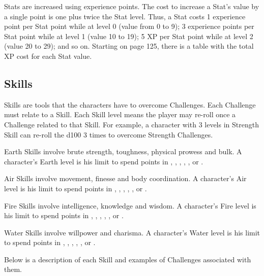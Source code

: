 \begin{multicols}{2}
Stats are increased using experience points. The cost to increase a Stat's value by a single point is one plus twice the Stat level. Thus, a Stat costs 1 experience point per Stat point while at level 0 (value from 0 to 9); 3 experience points per Stat point while at level 1 (value 10 to 19); 5 XP per Stat point while at level 2 (value 20 to 29); and so on. Starting on page 125, there is a table with the total XP cost for each Stat value. \pc
{\centering %
}%

\subsection{Skills}
\label{subsec:skills}
\begin{ffcolpage}
Skills are tools that the characters have to overcome Challenges. Each Challenge must relate to a Skill. Each Skill level means the player may re-roll once a Challenge related to that Skill. For example, a character with 3 levels in Strength Skill can re-roll the d100 3 times to overcome Strength Challenges. \pc

Earth Skills involve brute strength, toughness, physical prowess and bulk. A character's Earth level is his limit to spend points in , , , , , or . \pc

Air Skills involve movement, finesse and body coordination. A character's Air level is his limit to spend points in , , , , , or . \pc

Fire Skills involve intelligence, knowledge and wisdom. A character's Fire level is his limit to spend points in , , , , , or . \pc

Water Skills involve willpower and charisma. A character's Water level is his limit to spend points in , , , , , or .
\end{ffcolpage} \pc
Below is a description of each Skill and examples of Challenges associated with them. \pw


\end{multicols}
